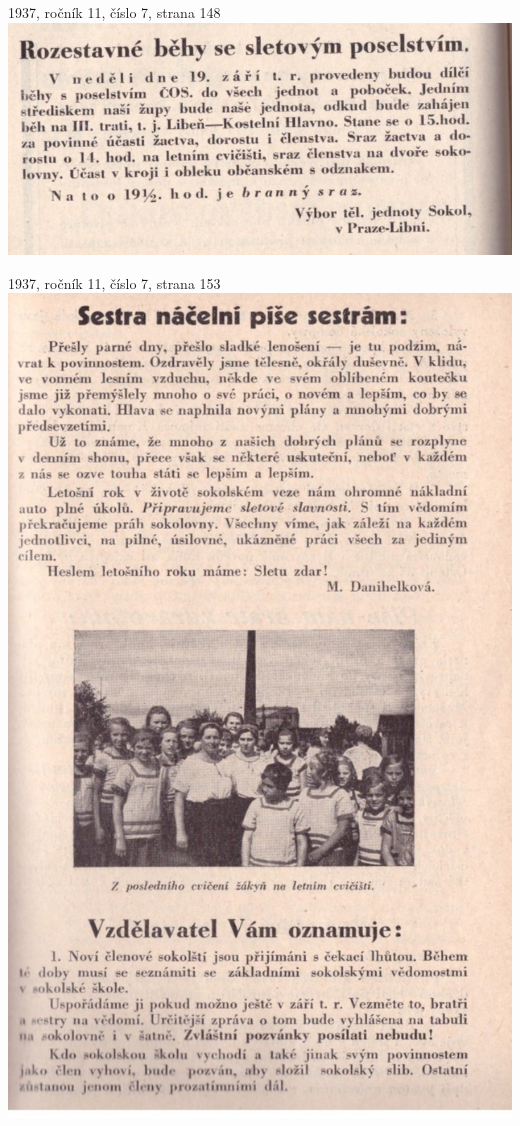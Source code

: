 \documentclass[11pt]{article}
\begin{document}
1937, ročník 11, číslo 7, strana 148 \\
\includegraphics[width=\imagewidth]{original/1937/Skener_20250325 (4).jpg}

1937, ročník 11, číslo 7, strana 153 \\
\includegraphics[width=\imagewidth]{original/1937/Skener_20250325 (5).jpg}
\end{document}
